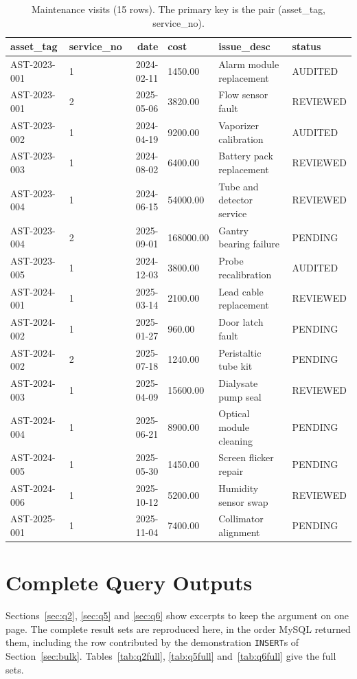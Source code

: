 \documentclass[conference]{IEEEtran}
\begin{document}
\begin{table}[!t]
\caption{Maintenance visits (15 rows). The primary key is the pair (asset\_tag, service\_no).}
\label{tab:data_log}
\centering
\footnotesize
\begin{tabular}{llrlp{3.6cm}l}
\toprule
asset\_tag & service\_no & date & cost & issue\_desc & status \\
\midrule
AST-2023-001 & 1 & 2024-02-11 & 1450.00 & Alarm module replacement & AUDITED \\
AST-2023-001 & 2 & 2025-05-06 & 3820.00 & Flow sensor fault & REVIEWED \\
AST-2023-002 & 1 & 2024-04-19 & 9200.00 & Vaporizer calibration & AUDITED \\
AST-2023-003 & 1 & 2024-08-02 & 6400.00 & Battery pack replacement & REVIEWED \\
AST-2023-004 & 1 & 2024-06-15 & 54000.00 & Tube and detector service & REVIEWED \\
AST-2023-004 & 2 & 2025-09-01 & 168000.00 & Gantry bearing failure & PENDING \\
AST-2023-005 & 1 & 2024-12-03 & 3800.00 & Probe recalibration & AUDITED \\
AST-2024-001 & 1 & 2025-03-14 & 2100.00 & Lead cable replacement & REVIEWED \\
AST-2024-002 & 1 & 2025-01-27 & 960.00 & Door latch fault & PENDING \\
AST-2024-002 & 2 & 2025-07-18 & 1240.00 & Peristaltic tube kit & PENDING \\
AST-2024-003 & 1 & 2025-04-09 & 15600.00 & Dialysate pump seal & REVIEWED \\
AST-2024-004 & 1 & 2025-06-21 & 8900.00 & Optical module cleaning & PENDING \\
AST-2024-005 & 1 & 2025-05-30 & 1450.00 & Screen flicker repair & PENDING \\
AST-2024-006 & 1 & 2025-10-12 & 5200.00 & Humidity sensor swap & REVIEWED \\
AST-2025-001 & 1 & 2025-11-04 & 7400.00 & Collimator alignment & PENDING \\
\bottomrule
\end{tabular}
\end{table}

\section{Complete Query Outputs}\label{app:outputs}
Sections~\ref{sec:q2}, \ref{sec:q5} and \ref{sec:q6} show excerpts to keep the argument on one
page. The complete result sets are reproduced here, in the order MySQL
returned them, including the row contributed by the demonstration
\texttt{INSERT}s of Section~\ref{sec:bulk}. Tables~\ref{tab:q2full}, \ref{tab:q5full}
and~\ref{tab:q6full} give the full sets.
\end{document}
